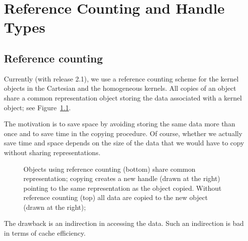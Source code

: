 
\chapter{Reference Counting and Handle Types}
\label{chap:reference_counting}


\section{Reference counting}
Currently (with release 2.1), we use a reference counting%
 scheme for 
the kernel objects in the Cartesian and the homogeneous kernels.
All copies of an object share a common representation object storing
the data associated with a kernel object; see Figure~\ref{fig:refcounted}.

The motivation is to save space by avoiding storing the same data more 
than once and to save time in the copying procedure. 
Of course, whether we actually save time and space depends on the size 
of the data that we would have to copy without sharing representations.

\begin{figure}
\caption{Objects using reference counting (bottom) share common representation;
copying creates a new handle (drawn at the right) pointing to the same 
representation as the object copied. Without reference counting (top) 
all data are copied to the new object (drawn at the right);\label{fig:refcounted}} 
\end{figure}

The drawback is an indirection in accessing the data. Such an indirection is 
bad in terms of cache efficiency. 

